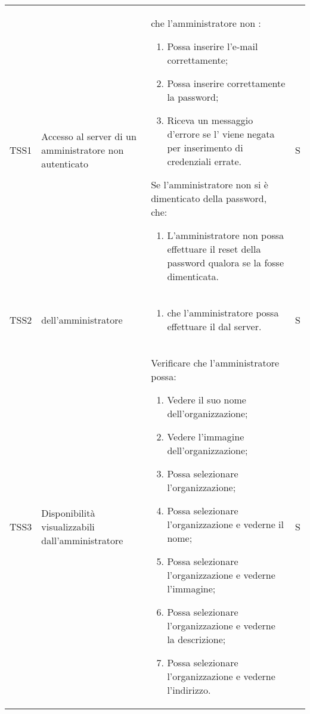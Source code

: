{\begin{longtable}{ c  C{2.5cm}  C{10cm} C{1cm}}
TSS1 & Accesso al server di un amministratore non autenticato & 
 che l'amministratore non :
\begin{enumerate}
    \item Possa inserire l'e-mail correttamente;
    \item Possa inserire correttamente la password;
    \item Riceva un messaggio d'errore se l' viene negata per inserimento di credenziali errate.
\end{enumerate}
Se l'amministratore non  si è dimenticato della password,  che:
\begin{enumerate}[resume]
    \item L'amministratore non  possa effettuare il reset della password qualora se la fosse dimenticata.
\end{enumerate} & S \\

TSS2 &  dell'amministratore  & \begin{enumerate}
    \item {} che l'amministratore  possa effettuare il  dal server.
\end{enumerate} & S \\

TSS3 & Disponibilità  visualizzabili dall'amministratore &
Verificare che l'amministratore possa:
\begin{enumerate}
    \item Vedere il suo nome dell'organizzazione;
    \item Vedere l'immagine dell'organizzazione;
    \item Possa selezionare l'organizzazione;
    \item Possa selezionare l'organizzazione e vederne il nome;
    \item Possa selezionare l'organizzazione e vederne l'immagine;
    \item Possa selezionare l'organizzazione e vederne la descrizione;
    \item Possa selezionare l'organizzazione e vederne l'indirizzo.
\end{enumerate} & S \\


\end{longtable}}
